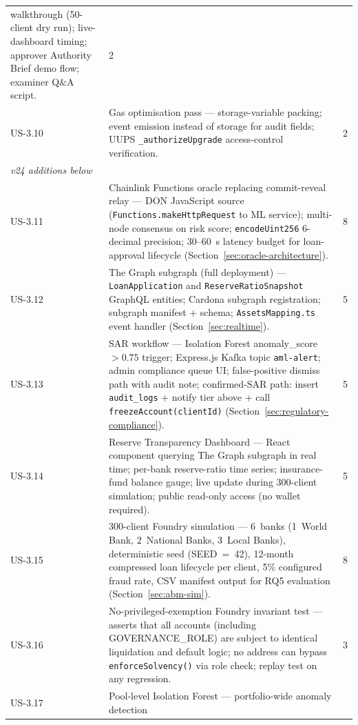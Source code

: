 \begin{table}[H]
\begin{tabular}{p{1.3cm}p{10.2cm}r}
  walkthrough (50-client dry run); live-dashboard timing; approver
  Authority Brief demo flow; examiner Q\&A script. & 2 \\
US-3.10 & Gas optimisation pass --- storage-variable packing; event
  emission instead of storage for audit fields; UUPS \texttt{\_authorizeUpgrade}
  access-control verification. & 2 \\
\hline
\multicolumn{2}{l}{\textit{v24 additions below}} & \\
\hline
US-3.11 & Chainlink Functions oracle replacing commit-reveal relay ---
  DON JavaScript source (\texttt{Functions.makeHttpRequest} to ML
  service); multi-node consensus on risk score; \texttt{encodeUint256}
  6-decimal precision; 30--60~s latency budget for loan-approval
  lifecycle (Section~\ref{sec:oracle-architecture}). & 8 \\
US-3.12 & The Graph subgraph (full deployment) --- \texttt{LoanApplication}
  and \texttt{ReserveRatioSnapshot} GraphQL entities; Cardona subgraph
  registration; subgraph manifest + schema; \texttt{AssetsMapping.ts}
  event handler (Section~\ref{sec:realtime}). & 5 \\
US-3.13 & SAR workflow --- Isolation Forest anomaly\_score $> 0.75$ trigger;
  Express.js Kafka topic \texttt{aml-alert}; admin compliance queue UI;
  false-positive dismiss path with audit note; confirmed-SAR path:
  insert \texttt{audit\_logs} + notify tier above + call
  \texttt{freezeAccount(clientId)}
  (Section~\ref{sec:regulatory-compliance}). & 5 \\
US-3.14 & Reserve Transparency Dashboard --- React component querying
  The Graph subgraph in real time; per-bank reserve-ratio time series;
  insurance-fund balance gauge; live update during 300-client simulation;
  public read-only access (no wallet required). & 5 \\
US-3.15 & 300-client Foundry simulation --- 6~banks (1~World Bank,
  2~National Banks, 3~Local Banks), deterministic seed (SEED~=~42),
  12-month compressed loan lifecycle per client, 5\% configured fraud
  rate, CSV manifest output for RQ5 evaluation
  (Section~\ref{sec:abm-sim}). & 8 \\
US-3.16 & No-privileged-exemption Foundry invariant test --- asserts that
  all accounts (including GOVERNANCE\_ROLE) are subject to identical
  liquidation and default logic; no address can bypass
  \texttt{enforceSolvency()} via role check; replay test on any
  regression. & 3 \\
US-3.17 & Pool-level Isolation Forest --- portfolio-wide anomaly detection

\end{tabular}
\end{table}
